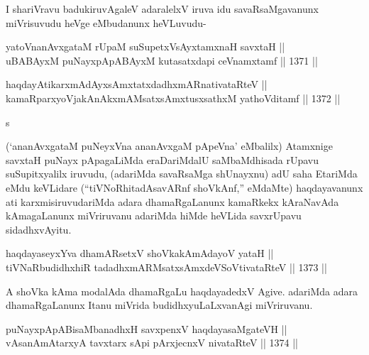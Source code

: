 \begin{artha}
I shariVravu badukiruvAgaleV adaralelxV iruva idu savaRsaMgavanunx miVrisuvudu heVge eMbudanunx heVLuvudu-
\end{artha}


\begin{shl}
yatoV\s nanAvxgataM rUpaM suSupetxV\s sAyx\s \s tamxnaH savxtaH || \\
uBABAyxM puNayxpApABAyxM kutasatxdapi ceVnamxtamf \hfill || 1371 ||  
\end{shl}
				
\begin{shl}
haqdayAtikarxmAdAyxsAmxtatxdadhxmARnativataRteV || \\
kamaRparxyoVjakAnAkxmAMsatxsAmxtusxsathxM yathoVditamf \hfill || 1372 ||  
\end{shl}s

\begin{artha}
(`ananAvxgataM puNeyxVna ananAvxgaM pApeVna' eMbalilx) Atamxnige savxtaH puNayx pApagaLiMda eraDariMdalU saMbaMdhisada rUpavu suSupitxyalilx iruvudu, (adariMda savaRsaMga shUnayxnu) adU saha EtariMda eMdu keVLidare (``tiVNoRhitadAsavARnf shoVkAnf,'' eMdaMte) haqdayavanunx ati karxmisiruvudariMda adara dhamaRgaLanunx kamaRkekx kAraNavAda kAmagaLanunx miVriruvanu adariMda hiMde heVLida savxrUpavu sidadhxvAyitu.
\end{artha}


\begin{shl}
haqdayaseyxYva dhamARsetxV shoVkakAmAdayoV yataH || \\
tiVNaRbudidhxhiR tadadhxmARMsatxsAmxdeVSoV\s tivataRteV \hfill || 1373 ||  
\end{shl}

\begin{artha}
A shoVka kAma modalAda dhamaRgaLu haqdayadedxV Agive. adariMda adara dhamaRgaLanunx Itanu miVrida budidhxyuLaLxvanAgi miVriruvanu.
\end{artha}


\begin{shl}
puNayxpApABisaMbanadhxH savxpenxV haqdayasaMgateVH || \\
vAsanAmAtarxyA tavxtarx sA\s pi pArxjecnxV nivataRteV \hfill || 1374 ||  
\end{shl}

